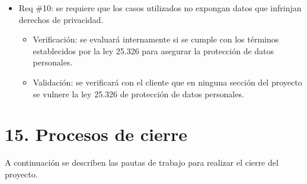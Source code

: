 \documentclass[
11pt, %
]{charter}
\begin{document}
\begin{itemize} 
	\item Req \#10: se requiere que los casos utilizados no expongan datos que infrinjan derechos de privacidad.
	
	\begin{itemize}
		\item Verificación: se evaluará internamente si se cumple con los términos establecidos por la ley 25.326 para asegurar la protección de datos personales.
		\item Validación: se verificará con el cliente que en ninguna sección del proyecto se vulnere la ley 25.326 de protección de datos personales.
	\end{itemize}
	
\end{itemize}

\section{15. Procesos de cierre}    
\label{sec:cierre}

A continuación se describen las pautas de trabajo para realizar el cierre del proyecto.
\end{document}
